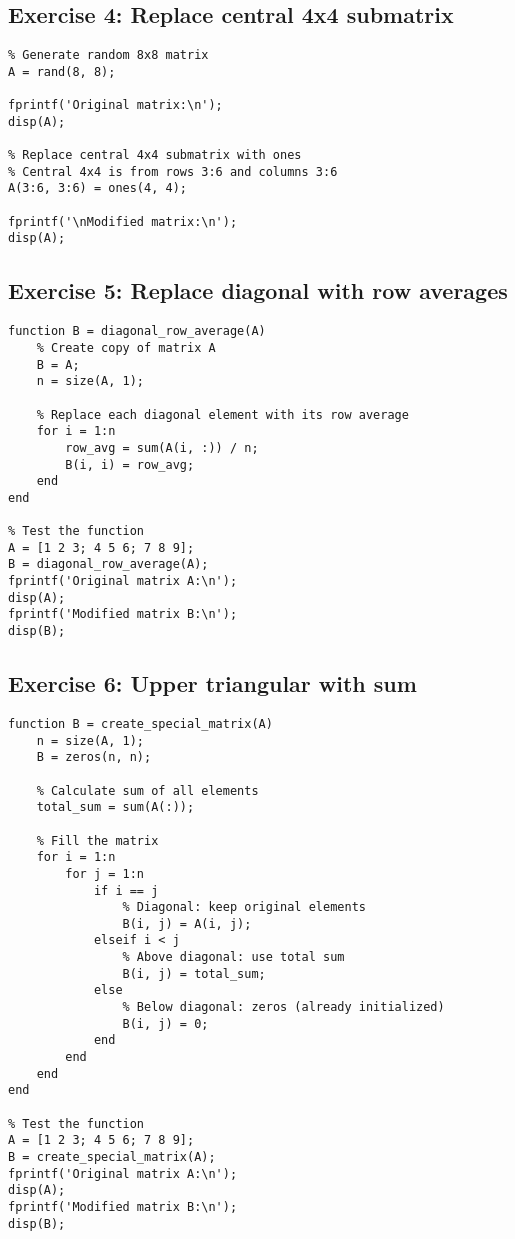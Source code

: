 \documentclass[oneside]{article}
\begin{document}
\subsection*{Exercise 4: Replace central 4x4 submatrix}

\begin{verbatim}
% Generate random 8x8 matrix
A = rand(8, 8);

fprintf('Original matrix:\n');
disp(A);

% Replace central 4x4 submatrix with ones
% Central 4x4 is from rows 3:6 and columns 3:6
A(3:6, 3:6) = ones(4, 4);

fprintf('\nModified matrix:\n');
disp(A);
\end{verbatim}

\subsection*{Exercise 5: Replace diagonal with row averages}

\begin{verbatim}
function B = diagonal_row_average(A)
    % Create copy of matrix A
    B = A;
    n = size(A, 1);
    
    % Replace each diagonal element with its row average
    for i = 1:n
        row_avg = sum(A(i, :)) / n;
        B(i, i) = row_avg;
    end
end

% Test the function
A = [1 2 3; 4 5 6; 7 8 9];
B = diagonal_row_average(A);
fprintf('Original matrix A:\n');
disp(A);
fprintf('Modified matrix B:\n');
disp(B);
\end{verbatim}

\subsection*{Exercise 6: Upper triangular with sum}

\begin{verbatim}
function B = create_special_matrix(A)
    n = size(A, 1);
    B = zeros(n, n);
    
    % Calculate sum of all elements
    total_sum = sum(A(:));
    
    % Fill the matrix
    for i = 1:n
        for j = 1:n
            if i == j
                % Diagonal: keep original elements
                B(i, j) = A(i, j);
            elseif i < j
                % Above diagonal: use total sum
                B(i, j) = total_sum;
            else
                % Below diagonal: zeros (already initialized)
                B(i, j) = 0;
            end
        end
    end
end

% Test the function
A = [1 2 3; 4 5 6; 7 8 9];
B = create_special_matrix(A);
fprintf('Original matrix A:\n');
disp(A);
fprintf('Modified matrix B:\n');
disp(B);
\end{verbatim}
\end{document}
